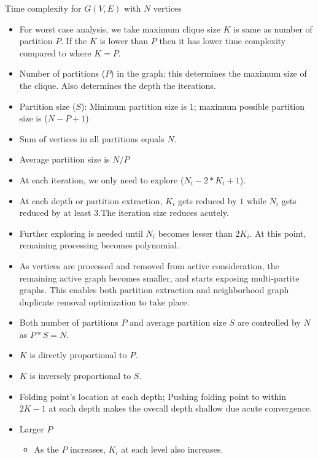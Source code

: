 \documentclass[landscape]{slides}
\begin{document}
\begin{slide}
	\begin{center}
		Time complexity for $G(V, E)$ with $N$ vertices
	\end{center}
	\begin{itemize}
		\setlength{\itemsep}{0pt}
		\setlength{\parskip}{10pt}
		\setlength{\parsep}{0pt}
		\item For worst case analysis, we take maximum clique size $K$ is same as number of partition $P$. If the $K$ is lower than $P$ then it has lower time complexity compared to where $K = P$.
		\item Number of partitions ($P$) in the graph: this determines the maximum size of the clique. Also determines the depth the iterations.
		\item Partition size ($S$): Minimum partition size is 1; maximum possible partition size is ($N - P + 1$)
		\item Sum of vertices in all partitions equals $N$.
		\item Average partition size is $N / P$
		\item At each iteration, we only need to explore ($N_i - 2 * K_i + 1$).
		\item At each depth or partition extraction, $K_i$ gets reduced by $1$ while $N_i$ gets reduced by at least $3$.The iteration size reduces acutely.
		\item Further exploring is needed until $N_i$ becomes lesser than $2K_i$. At this point, remaining processing becomes polynomial.
		\item As vertices are processed and removed from active consideration, the remaining active graph becomes smaller, and starts exposing multi-partite graphs. This enables both partition extraction and neighborhood graph duplicate removal optimization to take place.
		\item Both number of partitions $P$ and average partition size $S$ are controlled by $N$ as $P * S = N$.
		\item $K$ is directly proportional to $P$.
		\item $K$ is inversely proportional to $S$.
		\item Folding point's location at each depth; Pushing folding point to within $2K-1$ at each depth makes the overall depth shallow due acute convergence.
		\item Larger $P$
		\begin{itemize}
			\setlength{\itemsep}{0pt}
			\setlength{\parskip}{5pt}
			\setlength{\parsep}{0pt}
			\item As the $P$ increases, $K_i$ at each level also increases.

\end{itemize}
\end{itemize}
\end{slide}
\end{document}
